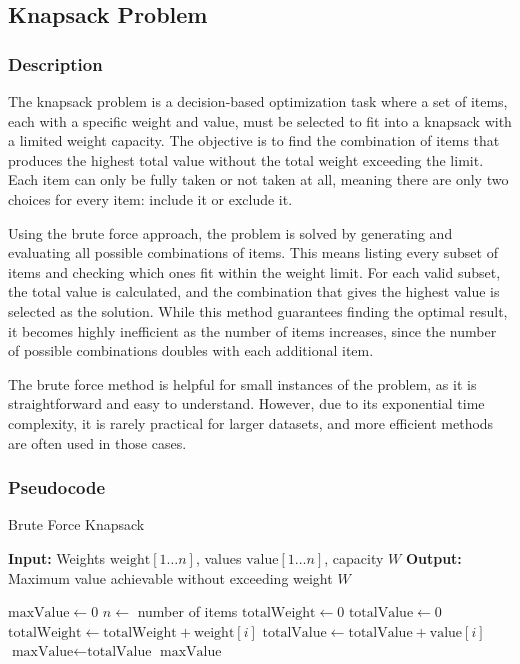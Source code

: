 \subsection{Knapsack Problem}

\subsubsection{Description}

The knapsack problem is a decision-based optimization task where a set of items, each with a specific weight and value, must be selected to fit into a knapsack with a limited weight capacity. The objective is to find the combination of items that produces the highest total value without the total weight exceeding the limit. Each item can only be fully taken or not taken at all, meaning there are only two choices for every item: include it or exclude it.

Using the brute force approach, the problem is solved by generating and evaluating all possible combinations of items. This means listing every subset of items and checking which ones fit within the weight limit. For each valid subset, the total value is calculated, and the combination that gives the highest value is selected as the solution. While this method guarantees finding the optimal result, it becomes highly inefficient as the number of items increases, since the number of possible combinations doubles with each additional item.

The brute force method is helpful for small instances of the problem, as it is straightforward and easy to understand. However, due to its exponential time complexity, it is rarely practical for larger datasets, and more efficient methods are often used in those cases.

\subsubsection{Pseudocode}

\begin{algorithm} [H]
    \caption{Brute Force Knapsack}
    \begin{algorithmic}
    \State{} \textbf{Input:} Weights $\text{weight}[1 \ldots n]$, values $\text{value}[1 \ldots n]$, capacity $W$
    \State{} \textbf{Output:} Maximum value achievable without exceeding weight $W$
    \State{}
    
    \State{} $\text{maxValue} \gets 0$
    \State{} $n \gets$ number of items
        \State{} $\text{totalWeight} \gets 0$
        \State{} $\text{totalValue} \gets 0$
            \State{} $\text{totalWeight} \gets \text{totalWeight} + \text{weight}[i]$
            \State{} $\text{totalValue} \gets \text{totalValue} + \text{value}[i]$
        \EndFor{}
            \State{} $\text{maxValue} \gets \text{totalValue}$
        \EndIf{}
    \EndFor{}
    \State{} \Return{} $\text{maxValue}$
    \end{algorithmic}
    \end{algorithm}
    

